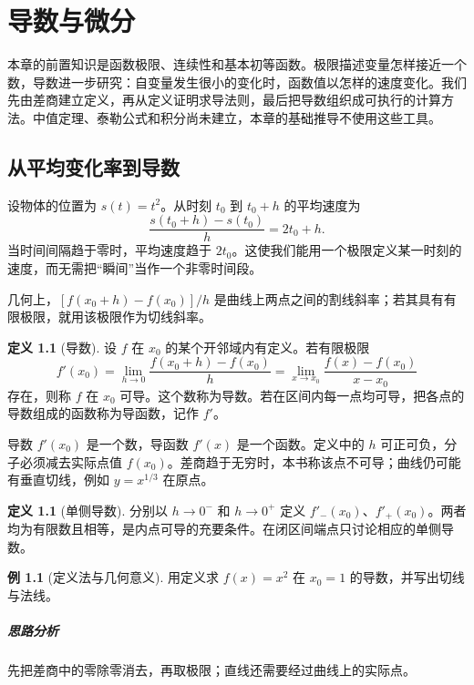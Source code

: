 \documentclass[UTF8,fontset=fandol,12pt,oneside,openany]{ctexrep}
\theoremstyle{definition}
\newtheorem{definition}[theorem]{定义}
\newtheorem{example}{例}[chapter]
\begin{document}
\chapter{导数与微分}
\label{lec:05:chapter}

本章的前置知识是函数极限、连续性和基本初等函数。极限描述变量怎样接近一个数，导数进一步研究：自变量发生很小的变化时，函数值以怎样的速度变化。我们先由差商建立定义，再从定义证明求导法则，最后把导数组织成可执行的计算方法。中值定理、泰勒公式和积分尚未建立，本章的基础推导不使用这些工具。

\section{从平均变化率到导数}
\label{lec:05:definition}

设物体的位置为 $s(t)=t^2$。从时刻 $t_0$ 到 $t_0+h$ 的平均速度为
\[
 \frac{s(t_0+h)-s(t_0)}h=2t_0+h.
\]
当时间间隔趋于零时，平均速度趋于 $2t_0$。这使我们能用一个极限定义某一时刻的速度，而无需把“瞬间”当作一个非零时间段。

几何上，$[f(x_0+h)-f(x_0)]/h$ 是曲线上两点之间的割线斜率；若其具有有限极限，就用该极限作为切线斜率。

\begin{definition}[导数]
设 $f$ 在 $x_0$ 的某个开邻域内有定义。若有限极限
\[
 f'(x_0)=\lim_{h\to0}\frac{f(x_0+h)-f(x_0)}h
       =\lim_{x\to x_0}\frac{f(x)-f(x_0)}{x-x_0}
\]
存在，则称 $f$ 在 $x_0$ 可导。这个数称为导数。若在区间内每一点均可导，把各点的导数组成的函数称为导函数，记作 $f'$。
\end{definition}

导数 $f'(x_0)$ 是一个数，导函数 $f'(x)$ 是一个函数。定义中的 $h$ 可正可负，分子必须减去实际点值 $f(x_0)$。差商趋于无穷时，本书称该点不可导；曲线仍可能有垂直切线，例如 $y=x^{1/3}$ 在原点。

\begin{definition}[单侧导数]
分别以 $h\to0^-$ 和 $h\to0^+$ 定义 $f'_-(x_0)$、$f'_+(x_0)$。两者均为有限数且相等，是内点可导的充要条件。在闭区间端点只讨论相应的单侧导数。
\end{definition}

\begin{example}[定义法与几何意义]
用定义求 $f(x)=x^2$ 在 $x_0=1$ 的导数，并写出切线与法线。
\end{example}
\paragraph{思路分析}先把差商中的零除零消去，再取极限；直线还需要经过曲线上的实际点。
\end{document}
